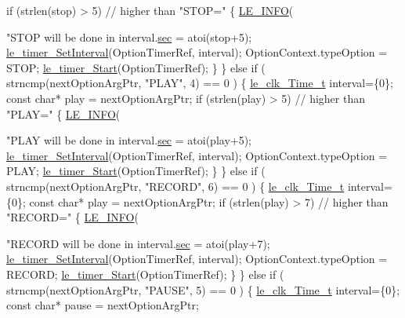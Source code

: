 \begin{DoxyCodeInclude}
{{{{{{{{{            \textcolor{keywordflow}{if} (strlen(stop) > 5) \textcolor{comment}{// higher than "STOP="}
            \{
                \hyperlink{le__log_8h_a23e6d206faa64f612045d688cdde5808}{LE\_INFO}(\textcolor{stringliteral}{"STOP will be done in %
                interval.\hyperlink{structle__clk___time__t_ae28e527dbd551b3537edc1737611782f}{sec} = atoi(stop+5);
                \hyperlink{le__timer_8h_a0a103d5cef5e83fc9088859d527bbd43}{le\_timer\_SetInterval}(OptionTimerRef, interval);
                OptionContext.typeOption = STOP;
                \hyperlink{watchdog_8c_a8f0ef9d6af3090467f5a969c799ad25d}{le\_timer\_Start}(OptionTimerRef);
            \}
        \}
        \textcolor{keywordflow}{else} \textcolor{keywordflow}{if} ( strncmp(nextOptionArgPtr, \textcolor{stringliteral}{"PLAY"}, 4) == 0 )
        \{
            \hyperlink{structle__clk___time__t}{le\_clk\_Time\_t} interval=\{0\};
            \textcolor{keyword}{const} \textcolor{keywordtype}{char}* play = nextOptionArgPtr;
            \textcolor{keywordflow}{if} (strlen(play) > 5) \textcolor{comment}{// higher than "PLAY="}
            \{
                \hyperlink{le__log_8h_a23e6d206faa64f612045d688cdde5808}{LE\_INFO}(\textcolor{stringliteral}{"PLAY will be done in %
                interval.\hyperlink{structle__clk___time__t_ae28e527dbd551b3537edc1737611782f}{sec} = atoi(play+5);
                \hyperlink{le__timer_8h_a0a103d5cef5e83fc9088859d527bbd43}{le\_timer\_SetInterval}(OptionTimerRef, interval);
                OptionContext.typeOption = PLAY;
                \hyperlink{watchdog_8c_a8f0ef9d6af3090467f5a969c799ad25d}{le\_timer\_Start}(OptionTimerRef);
            \}
        \}
        \textcolor{keywordflow}{else} \textcolor{keywordflow}{if} ( strncmp(nextOptionArgPtr, \textcolor{stringliteral}{"RECORD"}, 6) == 0 )
        \{
            \hyperlink{structle__clk___time__t}{le\_clk\_Time\_t} interval=\{0\};
            \textcolor{keyword}{const} \textcolor{keywordtype}{char}* play = nextOptionArgPtr;
            \textcolor{keywordflow}{if} (strlen(play) > 7) \textcolor{comment}{// higher than "RECORD="}
            \{
                \hyperlink{le__log_8h_a23e6d206faa64f612045d688cdde5808}{LE\_INFO}(\textcolor{stringliteral}{"RECORD will be done in %
                interval.\hyperlink{structle__clk___time__t_ae28e527dbd551b3537edc1737611782f}{sec} = atoi(play+7);
                \hyperlink{le__timer_8h_a0a103d5cef5e83fc9088859d527bbd43}{le\_timer\_SetInterval}(OptionTimerRef, interval);
                OptionContext.typeOption = RECORD;
                \hyperlink{watchdog_8c_a8f0ef9d6af3090467f5a969c799ad25d}{le\_timer\_Start}(OptionTimerRef);
            \}
        \}
        \textcolor{keywordflow}{else} \textcolor{keywordflow}{if} ( strncmp(nextOptionArgPtr, \textcolor{stringliteral}{"PAUSE"}, 5) == 0 )
        \{
            \hyperlink{structle__clk___time__t}{le\_clk\_Time\_t} interval=\{0\};
            \textcolor{keyword}{const} \textcolor{keywordtype}{char}* pause = nextOptionArgPtr;

}}}}}}}}}}}}
\end{DoxyCodeInclude}
